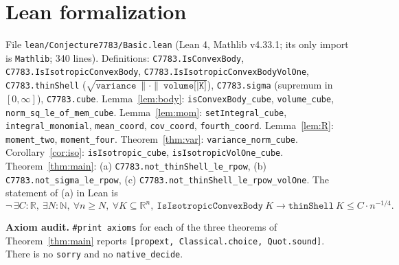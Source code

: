 \documentclass[11pt]{article}
\theoremstyle{definition}
\theoremstyle{remark}
\begin{document}
\section{Lean formalization}

File \texttt{lean/Conjecture7783/Basic.lean} (Lean 4, Mathlib v4.33.1; its only import is
\texttt{Mathlib}; 340 lines). Definitions: \texttt{C7783.IsConvexBody},
\texttt{C7783.IsIsotropicConvexBody}, \texttt{C7783.IsIsotropicConvexBodyVolOne},
\texttt{C7783.thinShell} ($\sqrt{\texttt{variance}\ \|\cdot\|\ \texttt{volume[|K]}}$),
\texttt{C7783.sigma} (supremum in $[0,\infty]$), \texttt{C7783.cube}.
Lemma~\ref{lem:body}: \texttt{isConvexBody\_cube}, \texttt{volume\_cube},
\texttt{norm\_sq\_le\_of\_mem\_cube}. Lemma~\ref{lem:mom}: \texttt{setIntegral\_cube},
\texttt{integral\_monomial}, \texttt{mean\_coord}, \texttt{cov\_coord}, \texttt{fourth\_coord}.
Lemma~\ref{lem:R}: \texttt{moment\_two}, \texttt{moment\_four}. Theorem~\ref{thm:var}:
\texttt{variance\_norm\_cube}. Corollary~\ref{cor:iso}: \texttt{isIsotropic\_cube},
\texttt{isIsotropicVolOne\_cube}. Theorem~\ref{thm:main}: (a)
\texttt{C7783.not\_thinShell\_le\_rpow}, (b) \texttt{C7783.not\_sigma\_le\_rpow}, (c)
\texttt{C7783.not\_thinShell\_le\_rpow\_volOne}. The statement of (a) in Lean is
\[
\neg\,\exists C:\mathbb R,\ \exists N:\mathbb N,\ \forall n\ge N,\ \forall K\subseteq\mathbb R^n,\
\mathtt{IsIsotropicConvexBody}\ K\to\mathtt{thinShell}\ K\le C\cdot n^{-1/4}.
\]

\textbf{Axiom audit.} \texttt{\#print axioms} for each of the three theorems of
Theorem~\ref{thm:main} reports \texttt{[propext, Classical.choice, Quot.sound]}. There is no
\texttt{sorry} and no \texttt{native\_decide}.
\end{document}
